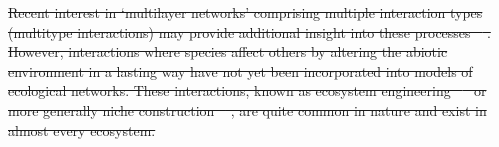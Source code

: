 \documentclass[twocolumn,preprintnumbers,amsmath,amssymb,superscriptaddress,linenumbers]{revtex4-1}
\providecommand{\DIFdel}[1]{{\protect\color{red}\sout{#1}}}                      %
\providecommand{\DIFdelbegin}{} %
\providecommand{\DIFdelend}{} %
\newcommand{\DIFscaledelfig}{0.5}
\newlength{\DIFdelgraphicswidth} %
\newlength{\DIFdelgraphicsheight} %
\newcommand{\DIFdelincludegraphics}[2][]{%
\sbox{\DIFdelgraphicsbox}{\DIFOincludegraphics[#1]{#2}}%
\settoboxwidth{\DIFdelgraphicswidth}{\DIFdelgraphicsbox} %
\settoboxtotalheight{\DIFdelgraphicsheight}{\DIFdelgraphicsbox} %
\scalebox{\DIFscaledelfig}{%
\parbox[b]{\DIFdelgraphicswidth}{\usebox{\DIFdelgraphicsbox}\\[-\baselineskip] \rule{\DIFdelgraphicswidth}{0em}}\llap{\resizebox{\DIFdelgraphicswidth}{\DIFdelgraphicsheight}{%
\setlength{\unitlength}{\DIFdelgraphicswidth}%
\begin{picture}(1,1)%
\thicklines\linethickness{2pt} %
{\color[rgb]{1,0,0}\put(0,0){\framebox(1,1){}}}%
{\color[rgb]{1,0,0}\put(0,0){\line( 1,1){1}}}%
{\color[rgb]{1,0,0}\put(0,1){\line(1,-1){1}}}%
\end{picture}%
}\hspace*{3pt}}} %
} %
\DeclareRobustCommand{\DIFdelbegin}{\DIFOdelbegin \let\includegraphics\DIFdelincludegraphics} %
\DeclareRobustCommand{\DIFdelend}{\DIFOaddend \let\includegraphics\DIFOincludegraphics} %
\begin{document}
\DIFdelbegin \DIFdel{Recent interest in `multilayer networks' comprising multiple interaction types (multitype interactions) may provide additional insight into these processes \mbox{%
\cite{Kefi2016,Pilosof2017}}\hspace{0pt}%
. 
However, interactions where species affect others by altering the abiotic environment in a lasting way have not yet been incorporated into models of ecological networks. 
These interactions, known as ecosystem engineering \mbox{%
\cite{Lawton1994,OdlingSmee2013} }\hspace{0pt}%
or more generally niche construction \mbox{%
\cite{OdlingSmee2013b,Fukami2015}}\hspace{0pt}%
, are quite common in nature and exist in almost every ecosystem.
}\DIFdelend %

\end{document}
